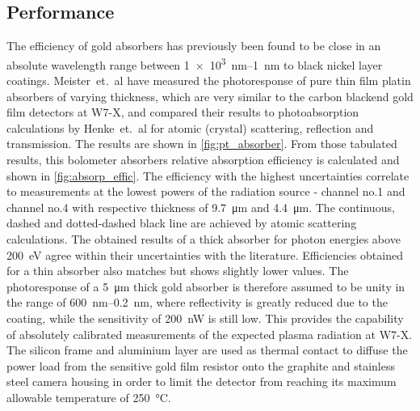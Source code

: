         \subsection{Performance}\label{subsec:performance}%
%
            The efficiency of gold absorbers has previously been found to be close in an absolute wavelength range between \SIrange{1e3}{1}{\nano\meter} to black nickel layer coatings\cite{Lang1996}. Meister~et.~al\cite{Meister2013} have measured the photoresponse of pure thin film platin absorbers of varying thickness, which are very similar to the carbon blackend gold film detectors at W7-X, and compared their results to photoabsorption calculations by Henke~et.~al\cite{Henke1993} for atomic (crystal) scattering, reflection and transmission. The results are shown in \cref{fig:pt_absorber}. From those tabulated results, this bolometer absorbers relative absorption efficiency is calculated and shown in \cref{fig:absorp_effic}. The efficiency with the highest uncertainties correlate to measurements at the lowest powers of the radiation source - channel no.1 and channel no.4 with respective thickness of \SI{9.7}{\micro\meter} and \SI{4.4}{\micro\meter}. The continuous, dashed and dotted-dashed black line are achieved by atomic scattering calculations\cite{Henke1993,Palik1997}. The obtained results of a thick absorber for photon energies above \SI{200}{\electronvolt} agree within their uncertainties with the literature. Efficiencies obtained for a thin absorber also matches but shows slightly lower values. The photoresponse of a \SI{5}{\micro\meter} thick gold absorber is therefore assumed to be unity in the range of \SIrange{600}{0.2}{\nano\meter}, where reflectivity is greatly reduced due to the coating, while the sensitivity of \SI{200}{\nano\watt} is still low. This provides the capability of absolutely calibrated measurements of the expected plasma radiation at W7-X.\\%
            The silicon frame and aluminium layer are used as thermal contact to diffuse the power load from the sensitive gold film resistor onto the graphite and stainless steel camera housing in order to limit the detector from reaching its maximum allowable temperature of \SI{250}{\celsius}.\\%
%
